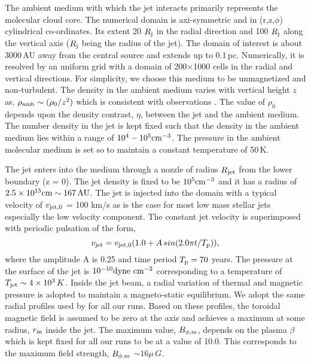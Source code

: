 \documentclass[useAMS,usenatbib]{mn2e}
\begin{document}
The ambient medium with which the jet interacts primarily
represents the molecular cloud core. The numerical domain is axi-symmetric
and in (r,z,$\phi$) cylindrical co-ordinates. Its extent 20 $R_{\rm j}$ in the radial
direction and 100
$R_{\rm j}$ along the vertical axis ($R_{\rm j}$ being the radius of
the jet). The domain of interest is about 3000\,AU away from the
central source and extends up to 0.1\,pc. Numerically, it is resolved by an uniform grid with a domain of 200$\times$1000 cells in the radial and vertical directions. For simplicity, we choose this medium
to be unmagnetized and non-turbulent. The density in the ambient
medium varies with vertical height $z$ as, $\rho_{\rm amb}\sim (\rho_0/z^{2})$
which is consistent with observations \citep{Keto:2010p15549, Caselli:2011p13935}. The value of
$\rho_0$ depends upon the density contrast, $\eta$, between the jet and
the ambient medium. The number density in the jet is kept fixed such
that the density in the ambient medium lies within a range of $10^{4}-10^{5}
\rm cm^{-3}$. The pressure in the ambient molecular medium is
set so to maintain a constant temperature of 50\,K. 
%

The jet enters into the medium through a nozzle of radius $R_{\rm jet}$
from the lower boundary (z = 0). The jet density is fixed to
be $10^{5} \rm cm^{-3}$ and it has a radius of $2.5\times10^{15} \rm cm \sim
167\,AU$. The jet is injected into the domain with a typical 
velocity of $v_{\rm jet,0}$ = 100 km/s as is the case for most low mass stellar jets
especially the low velocity component. The constant jet velocity is
superimposed with periodic pulsation of the form,
\begin{equation}
v_{\rm jet} = v_{\rm jet,0}(1.0 + A\,sin(2.0\pi t/T_{\rm p})),
\end{equation}
where the amplitude A is 0.25 and time period $T_{\rm p} = 70$
years. The pressure at the surface of the jet is $10^{-10} \rm
dyne\,\,cm^{-2}$ corresponding to a temperature of $T_{\rm jet} \sim
4\times10^{3}\,K$. Inside the jet beam, a radial variation of thermal
and magnetic pressure is adopted to maintain a magneto-static
equilibrium. We adopt the
same radial profiles used by \cite{Stone:2000p2650} for all our runs. 
Based on these profiles, the toroidal magnetic field is assumed to be
zero at the axis and achieves a maximum at some radius, $r_{\rm m}$
inside the jet. The maximum value, $B_{\phi,\rm m}$, depends on the
plasma $\beta$ which is kept fixed for all our runs to be at a value
of 10.0. This corresponds to the maximum field strength, $B_{\phi,\rm m}$ $\sim
16\mu\,G$. 
\end{document}
